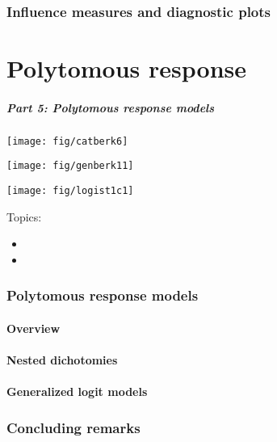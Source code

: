 \section{Influence measures and diagnostic plots}


\part{Polytomous response}
\begin{frame}
  \frametitle{Part 5: Polytomous response models}
 \begin{minipage}[c]{.33\textwidth}
  \texttt{[image: fig/catberk6]}
  \end{minipage}%
 \hfill
 \begin{minipage}[c]{.33\textwidth}
  \texttt{[image: fig/genberk11]}
 \end{minipage}
 \hfill
 \begin{minipage}[c]{.33\textwidth}
  \texttt{[image: fig/logist1c1]}
 \end{minipage}

Topics:
  \begin{itemize}
    \item 
	  \begin{itemize*} 
	    \item 
		\item 
	  \end{itemize*} 
	\item 
	  \begin{itemize*} 
	    \item 
		\item 
		\item 
	  \end{itemize*} 
  \end{itemize}
\end{frame}

\section{Polytomous response models}
\subsection{Overview}

\subsection{Nested dichotomies}

\subsection{Generalized logit models}

\section{Concluding remarks}


\endinput
